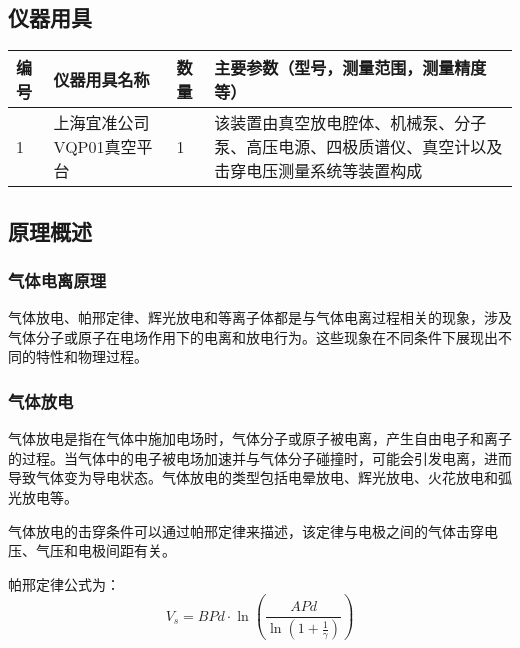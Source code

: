 \documentclass[dvipsnames, svgnames,a4paper,11pt]{article}
\begin{document}
\subsection{仪器用具}
\begin{table}[htbp]
	\centering
	\renewcommand\arraystretch{1.6}
	\begin{tabular}{p{}|p{}|p{}|p{}}
	\hline
	编号& 仪器用具名称 & 数量 &  主要参数（型号，测量范围，测量精度等） \\
	\hline
	1&上海宜准公司VQP01真空平台 &1 & 该装置由真空放电腔体、机械泵、分子泵、高压电源、四极质谱仪、真空计以及击穿电压测量系统等装置构成\\


	\hline
\end{tabular}
\end{table}

\subsection{原理概述}
		\subsubsection{气体电离原理}
		气体放电、帕邢定律、辉光放电和等离子体都是与气体电离过程相关的现象，涉及气体分子或原子在电场作用下的电离和放电行为。这些现象在不同条件下展现出不同的特性和物理过程。

			\subsubsection{气体放电}
			气体放电是指在气体中施加电场时，气体分子或原子被电离，产生自由电子和离子的过程。当气体中的电子被电场加速并与气体分子碰撞时，可能会引发电离，进而导致气体变为导电状态。气体放电的类型包括电晕放电、辉光放电、火花放电和弧光放电等。
		
			气体放电的击穿条件可以通过帕邢定律来描述，该定律与电极之间的气体击穿电压、气压和电极间距有关。
			
			帕邢定律公式为：
			\[
			V_s = B P d \cdot \ln \left( \frac{A P d}{\ln\left(1 + \frac{1}{\gamma}\right)} \right)
			\]
			
\end{document}
